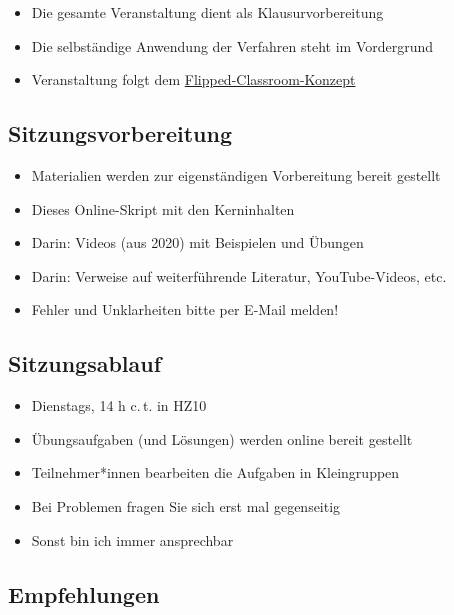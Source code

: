 \documentclass[
  11pt,
  ngerman,
  a4paper,
]{report}
\providecommand{\tightlist}{%
  \setlength{\itemsep}{0pt}\setlength{\parskip}{0pt}}
\begin{document}
\begin{itemize}
\tightlist
\item
  Die gesamte Veranstaltung dient als Klausurvorbereitung
\item
  Die selbständige Anwendung der Verfahren steht im Vordergrund
\item
  Veranstaltung folgt dem \href{https://de.wikipedia.org/wiki/Umgedrehter_Unterricht}{Flipped-Classroom-Konzept}
\end{itemize}

\hypertarget{sitzungsvorbereitung}{%
\subsection*{Sitzungsvorbereitung}\label{sitzungsvorbereitung}}

\begin{itemize}
\tightlist
\item
  Materialien werden zur eigenständigen Vorbereitung bereit gestellt
\item
  Dieses Online-Skript mit den Kerninhalten
\item
  Darin: Videos (aus 2020) mit Beispielen und Übungen
\item
  Darin: Verweise auf weiterführende Literatur, YouTube-Videos, etc.
\item
  Fehler und Unklarheiten bitte per E-Mail melden!
\end{itemize}

\hypertarget{sitzungsablauf}{%
\subsection*{Sitzungsablauf}\label{sitzungsablauf}}

\begin{itemize}
\tightlist
\item
  Dienstags, 14 h c.\,t. in HZ10
\item
  Übungsaufgaben (und Lösungen) werden online bereit gestellt
\item
  Teilnehmer*innen bearbeiten die Aufgaben in Kleingruppen
\item
  Bei Problemen fragen Sie sich erst mal gegenseitig
\item
  Sonst bin ich immer ansprechbar
\end{itemize}

\hypertarget{empfehlungen}{%
\subsection*{Empfehlungen}\label{empfehlungen}}
\end{document}
